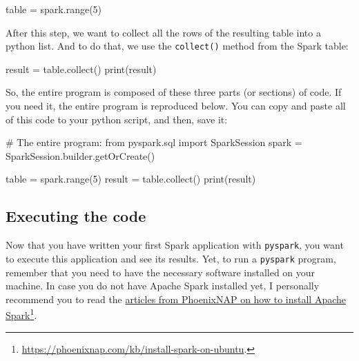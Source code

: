 \documentclass[
  11pt,
  letterpaper,
  DIV=11,
  numbers=noendperiod]{scrreprt}
\newenvironment{Shaded}{\begin{snugshade}}{\end{snugshade}}
\newcommand{\BuiltInTok}[1]{\textcolor[rgb]{0.00,0.23,0.31}{#1}}
\newcommand{\CommentTok}[1]{\textcolor[rgb]{0.37,0.37,0.37}{#1}}
\newcommand{\DecValTok}[1]{\textcolor[rgb]{0.68,0.00,0.00}{#1}}
\newcommand{\ImportTok}[1]{\textcolor[rgb]{0.00,0.46,0.62}{#1}}
\newcommand{\NormalTok}[1]{\textcolor[rgb]{0.00,0.23,0.31}{#1}}
\newcommand{\OperatorTok}[1]{\textcolor[rgb]{0.37,0.37,0.37}{#1}}
\begin{document}
\begin{Shaded}
\begin{Highlighting}[]
\NormalTok{table }\OperatorTok{=}\NormalTok{ spark.}\BuiltInTok{range}\NormalTok{(}\DecValTok{5}\NormalTok{)}
\end{Highlighting}
\end{Shaded}

After this step, we want to collect all the rows of the resulting table
into a python list. And to do that, we use the \texttt{collect()} method
from the Spark table:

\begin{Shaded}
\begin{Highlighting}[]
\NormalTok{result }\OperatorTok{=}\NormalTok{ table.collect()}
\BuiltInTok{print}\NormalTok{(result)}
\end{Highlighting}
\end{Shaded}

So, the entire program is composed of these three parts (or sections) of
code. If you need it, the entire program is reproduced below. You can
copy and paste all of this code to your python script, and then, save
it:

\begin{Shaded}
\begin{Highlighting}[]
\CommentTok{\# The entire program:}
\ImportTok{from}\NormalTok{ pyspark.sql }\ImportTok{import}\NormalTok{ SparkSession}
\NormalTok{spark }\OperatorTok{=}\NormalTok{ SparkSession.builder.getOrCreate()}

\NormalTok{table }\OperatorTok{=}\NormalTok{ spark.}\BuiltInTok{range}\NormalTok{(}\DecValTok{5}\NormalTok{)}
\NormalTok{result }\OperatorTok{=}\NormalTok{ table.collect()}
\BuiltInTok{print}\NormalTok{(result)}
\end{Highlighting}
\end{Shaded}

\hypertarget{executing-the-code}{%
\subsection{Executing the code}\label{executing-the-code}}

Now that you have written your first Spark application with
\texttt{pyspark}, you want to execute this application and see its
results. Yet, to run a \texttt{pyspark} program, remember that you need
to have the necessary software installed on your machine. In case you do
not have Apache Spark installed yet, I personally recommend you to read
the \href{https://phoenixnap.com/kb/install-spark-on-ubuntu}{articles
from PhoenixNAP on how to install Apache Spark}\footnote{\url{https://phoenixnap.com/kb/install-spark-on-ubuntu}.}.
\end{document}
